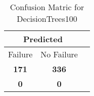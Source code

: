 \begin{table}[] 
\caption{Confusion Matric for DecisionTrees100} 
\label{Table: Prediction Accuracy-NoneDecisionTrees100DecisionTreesEKF-ignoreNone100.9EKF-top2-None} 
\centering 
\begin{tabular} 
 {@{}ccc@{}} 
\toprule 
\multicolumn{2}{c}{\textbf{Predicted}}
 \\ \midrule 
\multicolumn{1}{|c|}{Failure} & 
\multicolumn{1}{c|}{No Failure}
 \\ \midrule 
\multicolumn{1}{|c|}{\color{green}\textbf{171}} & 
\multicolumn{1}{c|}{\color{green}\textbf{336}}
 \\ \midrule 
\multicolumn{1}{|c|}{\color{red}\textbf{0}} & 
\multicolumn{1}{c|}{\color{red}\textbf{0}}
 \\ \bottomrule 
\end{tabular} 
\end{table} 
